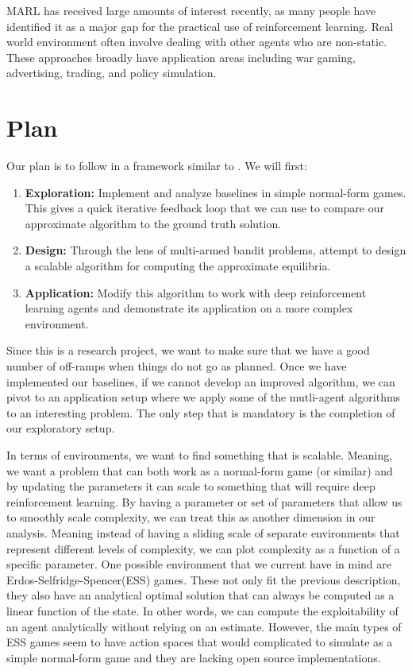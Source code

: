 \documentclass{article}
\begin{document}
MARL has received large amounts of interest recently, as many people have
identified it as a major gap for the practical use of reinforcement learning.
Real world environment often involve dealing with other agents who are
non-static. These approaches broadly have application areas including war gaming,
advertising, trading, and policy simulation.

\section{Plan}
Our plan is to follow in a framework similar to \cite{dip}. We will first:
\begin{enumerate}
	\item \textbf{Exploration:} Implement and analyze baselines in simple
        normal-form games. This gives a quick iterative feedback loop that we
        can use to compare our approximate algorithm to the ground truth
        solution.
	\item \textbf{Design:} Through the lens of multi-armed bandit problems,
        attempt to design a scalable algorithm for computing the approximate
        equilibria.
    \item \textbf{Application:} Modify this algorithm to work with deep reinforcement learning agents
      and demonstrate its application on a more complex environment.
\end{enumerate}
Since this is a research project, we want to make sure that we have a good
number of off-ramps when things do not go as planned. Once we have implemented
our baselines, if we cannot develop an improved algorithm, we can pivot to an
application setup where we apply some of the mutli-agent algorithms to an
interesting problem. The only step that is mandatory is the completion of our
exploratory setup. 

In terms of environments, we want to find something that is scalable. Meaning,
we want a problem that can both work as a normal-form game (or similar) and by
updating the parameters it can scale to something that will require deep
reinforcement learning. By having a parameter or set of parameters that allow us
to smoothly scale complexity, we can treat this as another dimension in our
analysis. Meaning instead of having a sliding scale of separate environments
that represent different levels of complexity, we can plot complexity as a
function of a specific parameter. One possible environment that we current have
in mind are Erdos-Selfridge-Spencer(ESS)\cite{ESS} games. These not only fit the
previous description, they also have an analytical optimal solution that can
always be computed as a linear function of the state. In other words, we can
compute the exploitability of an agent analytically without relying on an
estimate. However, the main types of ESS games seem to have action spaces that
would complicated to simulate as a simple normal-form game and they are lacking
open source implementations.
\end{document}
